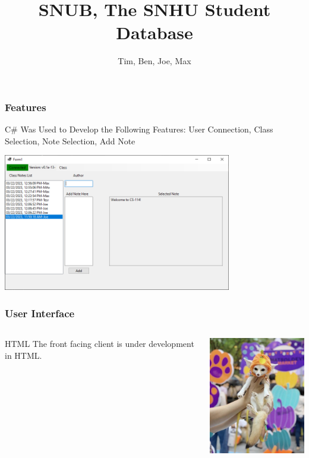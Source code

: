 \documentclass{beamer}
\title{SNUB, The SNHU Student Database}
\author{Tim, Ben, Joe, Max}
\institute{SNHU CS-114}
\begin{document}
\frame{\titlepage} %

\begin{frame}
    \frametitle{Features}

    \begin{block}{\centering C\# Was Used to Develop the Following Features:}
        \centering User Connection, Class Selection, Note Selection, Add Note
    \end{block}

    \centering \includegraphics[height=6cm]{Sample_of_Features.PNG}
\end{frame}

\begin{frame}
    \frametitle{User Interface}

    \begin{columns}
        \begin{column}{0.48\textwidth}
            \begin{block}{HTML}
                The front facing client is under development in HTML.
            \end{block}
        \end{column}
        \begin{column}{0.48\textwidth}
            \includegraphics[width=5cm]{what_is_this_thing}
        \end{column}
    \end{columns}

\end{frame}
\end{document}
